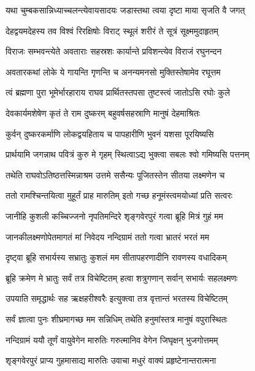 \twolineshloka
{यथा चुम्बकसान्निध्याच्चलन्त्येवायसादयः}
{जडास्तथा त्वया दृष्टा माया सृजति वै जगत्} %

\twolineshloka
{देहद्वयमदेहस्य तव विश्वं रिरक्षिषोः}
{विराट् स्थूलं शरीरं ते सूत्रं सूक्ष्ममुदाहृतम्} %

\twolineshloka
{विराजः सम्भवन्त्येते अवताराः सहस्रशः}
{कार्यान्ते प्रविशन्त्येव विराजं रघुनन्दन} %

\twolineshloka
{अवतारकथां लोके ये गायन्ति गृणन्ति च}
{अनन्यमनसो मुक्तिस्तेषामेव रघूत्तम} %

\twolineshloka
{त्वं ब्रह्मणा पुरा भूमेर्भारहाराय राघव}
{प्रार्थितस्तपसा तुष्टस्त्वं जातोऽसि रघोः कुले} %

\twolineshloka
{देवकार्यमशेषेण कृतं ते राम दुष्करम्}
{बहुवर्षसहस्राणि मानुषं देहमाश्रितः} %

\twolineshloka
{कुर्वन् दुष्करकर्माणि लोकद्वयहिताय च}
{पापहारीणि भुवनं यशसा पूरयिष्यसि} %

\twolineshloka
{प्रार्थयामि जगन्नाथ पवित्रं कुरु मे गृहम्}
{स्थित्वाऽद्य भुक्त्वा सबलः श्वो गमिष्यसि पत्तनम्} %

\twolineshloka
{तथेति राघवोऽतिष्ठत्तस्मिन्नाश्रम उत्तमे}
{ससैन्यः पूजितस्तेन सीतया लक्ष्मणेन च} %

\twolineshloka
{ततो रामश्चिन्तयित्वा मुहूर्तं प्राह मारुतिम्}
{इतो गच्छ हनूमंस्त्वमयोध्यां प्रति सत्वरः} %

\twolineshloka
{जानीहि कुशली कच्चिज्जनो नृपतिमन्दिरे}
{शृङ्गवेरपुरं गत्वा ब्रूहि मित्रं गुहं मम} %

\twolineshloka
{जानकीलक्ष्मणोपेतमागतं मां निवेदय}
{नन्दिग्रामं ततो गत्वा भ्रातरं भरतं मम} %

\twolineshloka
{दृष्ट्वा ब्रूहि सभार्यस्य सभ्रातुः कुशलं मम}
{सीतापहरणादीनि रावणस्य वधादिकम्} %

\twolineshloka
{ब्रूहि क्रमेण मे भ्रातुः सर्वं तत्र विचेष्टितम्}
{हत्वा शत्रुगणान् सर्वान् सभार्यः सहलक्ष्मणः} %

\twolineshloka
{उपयाति समृद्धार्थः सह ऋक्षहरीश्वरैः}
{इत्युक्त्वा तत्र वृत्तान्तं भरतस्य विचेष्टितम्} %

\twolineshloka
{सर्वं ज्ञात्वा पुनः शीघ्रमागच्छ मम सन्निधिम्}
{तथेति हनुमांस्तत्र मानुषं वपुरास्थितः} %

\twolineshloka
{नन्दिग्रामं ययौ तूर्णं वायुवेगेन मारुतिः}
{गरुत्मानिव वेगेन जिघृक्षन् भुजगोत्तमम्} %

\twolineshloka
{शृङ्गवेरपुरं प्राप्य गुहमासाद्य मारुतिः}
{उवाचा मधुरं वाक्यं प्रहृष्टेनान्तरात्मना} %

